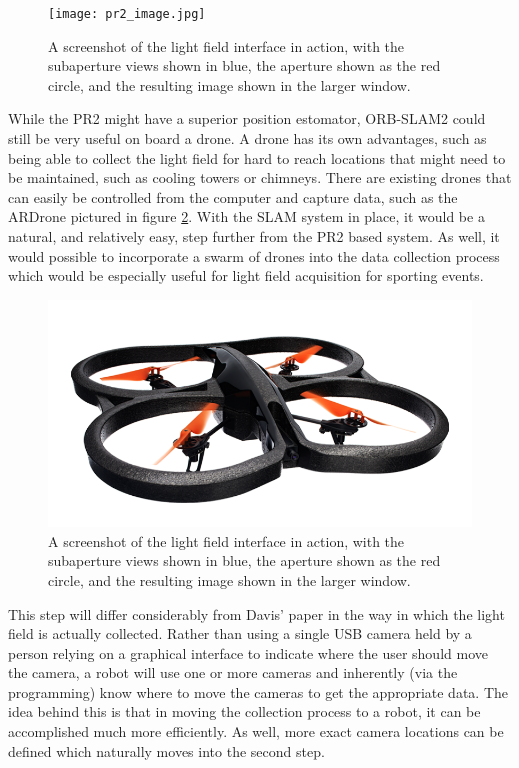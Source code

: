 \documentclass[12pt]{report}
\begin{document}
\begin{figure}[!ht]
	\centering
	\texttt{[image: pr2\_image.jpg]}
	\caption{A screenshot of the light field interface in action, with the subaperture views shown in blue, the aperture shown as the red circle, and the resulting image shown in the larger window.}
	\label{fig:pr2_image}
\end{figure}
While the PR2 might have a superior position estomator, ORB-SLAM2 could still be very useful on board a drone. A drone has its own advantages, such as being able to collect the light field for hard to reach locations that might need to be maintained, such as cooling towers or chimneys. There are existing drones that can easily be controlled from the computer and capture data, such as the ARDrone pictured in figure \ref{fig:ardrone_image}. With the SLAM system in place, it would be a natural, and relatively easy, step further from the PR2 based system. As well, it would possible to incorporate a swarm of drones into the data collection process which would be especially useful for light field acquisition for sporting events.
\begin{figure}[!ht]
	\centering
	\includegraphics[scale=0.4]{ardrone_image.png}
	\caption{A screenshot of the light field interface in action, with the subaperture views shown in blue, the aperture shown as the red circle, and the resulting image shown in the larger window.}
	\label{fig:ardrone_image}
\end{figure}
This step will differ considerably from Davis' paper in the way in which the light field is actually collected. Rather than using a single USB camera held by a person relying on a graphical interface to indicate where the user should move the camera, a robot will use one or more cameras and inherently (via the programming) know where to move the cameras to get the appropriate data. The idea behind this is that in moving the collection process to a robot, it can be accomplished much more efficiently. As well, more exact camera locations can be defined which naturally moves into the second step.
\end{document}

